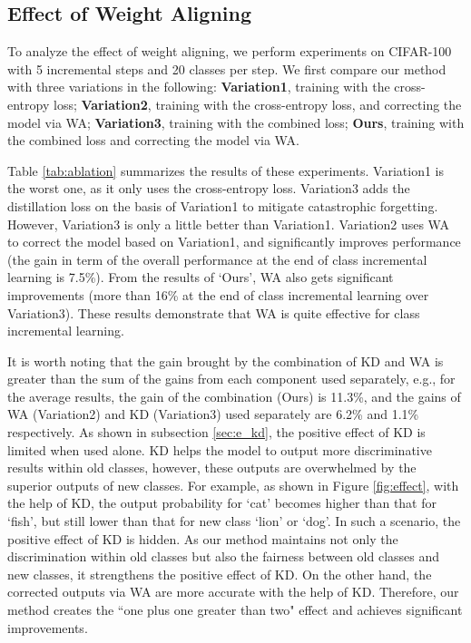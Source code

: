 \documentclass[10pt,twocolumn,letterpaper]{article}
\begin{document}
\subsection{Effect of Weight Aligning}
To analyze the effect of weight aligning, we perform experiments on CIFAR-100 with 5 incremental steps and 20 classes per step. We first compare our method with three variations in the following: \textbf{Variation1}, training with the cross-entropy loss; \textbf{Variation2}, training with the cross-entropy loss, and correcting the model via WA; \textbf{Variation3}, training with the combined loss; \textbf{Ours}, training with the combined loss and correcting the model via WA.

Table \ref{tab:ablation} summarizes the results of these experiments. Variation1 is the worst one, as it only uses the cross-entropy loss. Variation3 adds the distillation loss on the basis of Variation1 to mitigate catastrophic forgetting. However, Variation3 is only a little better than Variation1. Variation2 uses WA to correct the model based on Variation1, and significantly improves performance (the gain in term of the overall performance at the end of class incremental learning is 7.5\%). From the results of `Ours', WA also gets significant improvements (more than 16\% at the end of class incremental learning over Variation3). These results demonstrate that WA is quite effective for class incremental learning. 

It is worth noting that the gain brought by the combination of KD and WA is greater than the sum of the gains from each component used separately, e.g., for the average results, the gain of the combination (Ours) is 11.3\%, and the gains of WA (Variation2) and KD (Variation3) used separately are 6.2\% and 1.1\% respectively. As shown in subsection \ref{sec:e_kd}, the positive effect of KD is limited when used alone. KD helps the model to output more discriminative results within old classes, however, these outputs are overwhelmed by the superior outputs of new classes. For example, as shown in Figure \ref{fig:effect}, with the help of KD, the output probability for `cat' becomes higher than that for `fish', but still lower than that for new class `lion' or `dog'. In such a scenario, the positive effect of KD is hidden. As our method maintains not only the discrimination within old classes but also the fairness between old classes and new classes, it strengthens the positive effect of KD. On the other hand, the corrected outputs via WA are more accurate with the help of KD. Therefore, our method creates the ``one plus one greater than two" effect and achieves significant improvements.
\end{document}

